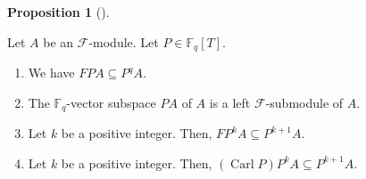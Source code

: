 \documentclass[numbers=enddot,12pt,final,onecolumn,notitlepage]{scrartcl}%
\theoremstyle{definition}
\newtheorem{prop}[theo]{Proposition}
\newenvironment{proposition}[1][]
{\begin{prop}[#1]\begin{leftbar}}
{\end{leftbar}\end{prop}}
\begin{document}
\begin{proposition}
\label{prop.F.lift.FPA}Let $A$ be an $\mathcal{F}$-module. Let $P\in
\mathbb{F}_{q}\left[  T\right]  $.

\begin{enumerate}
\item[\textbf{(a)}] We have $FPA\subseteq P^{q}A$.

\item[\textbf{(b)}] The $\mathbb{F}_{q}$-vector subspace $PA$ of $A$ is a left
$\mathcal{F}$-submodule of $A$.

\item[\textbf{(c)}] Let $k$ be a positive integer. Then, $FP^{k}A\subseteq
P^{k+1}A$.

\item[\textbf{(d)}] Let $k$ be a positive integer. Then, $\left(
\operatorname*{Carl}P\right)  P^{k}A\subseteq P^{k+1}A$.
\end{enumerate}
\end{proposition}
\end{document}
